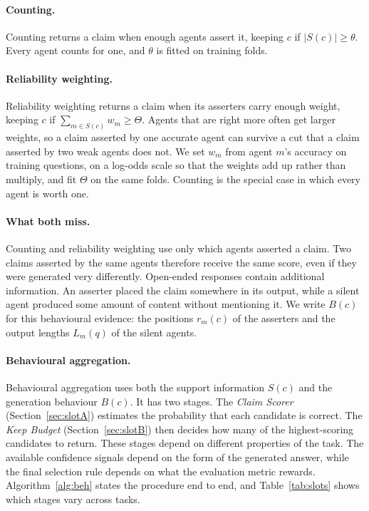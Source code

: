 \documentclass[11pt]{article}
\begin{document}
\paragraph{Counting.}
Counting returns a claim when enough agents assert it, keeping $c$ if
$|S(c)| \geq \theta$. Every agent counts for one, and $\theta$ is fitted on training
folds.

\paragraph{Reliability weighting.}
Reliability weighting returns a claim when its asserters carry enough weight, keeping
$c$ if $\sum_{m \in S(c)} w_m \geq \Theta$. Agents that are right more often get larger
weights, so a claim asserted by one accurate agent can survive a cut that a claim
asserted by two weak agents does not. We set $w_m$ from agent $m$'s accuracy on training
questions, on a log-odds scale so that the weights add up rather than multiply, and fit
$\Theta$ on the same folds. Counting is the special case in which every agent is
worth one.

\paragraph{What both miss.}
Counting and reliability weighting use only which agents asserted a claim. Two claims
asserted by the same agents therefore receive the same score, even if they were generated
very differently. Open-ended responses contain additional information. An asserter placed
the claim somewhere in its output, while a silent agent produced some amount of content
without mentioning it. We write $B(c)$ for this behavioural evidence: the positions
$r_m(c)$ of the asserters and the output lengths $L_m(q)$ of the silent agents.

\paragraph{Behavioural aggregation.}
Behavioural aggregation uses both the support information $S(c)$ and the generation
behaviour $B(c)$. It has two stages. The \emph{Claim Scorer}
(Section~\ref{sec:slotA}) estimates the probability that each candidate is correct. The
\emph{Keep Budget} (Section~\ref{sec:slotB}) then decides how many of the highest-scoring
candidates to return. These stages depend on different properties of the task. The
available confidence signals depend on the form of the generated answer, while the final
selection rule depends on what the evaluation metric rewards. Algorithm~\ref{alg:beh} states the procedure end to end, and Table~\ref{tab:slots} shows which stages vary across tasks.
\end{document}
